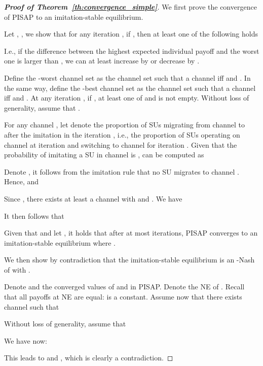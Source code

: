 \documentclass[12pt, onecolumn]{IEEEtran}
\theoremstyle{plain}
\theoremstyle{definition}
\begin{document}



\appendix

\begin{proof}[\textbf{Proof of Theorem~\ref{th:convergence_simple}}]

We first prove the convergence of PISAP to an imitation-stable equilibrium.

Let , , we show that for any iteration , if , then at least one of the following holds

I.e., if the difference between the highest expected individual payoff  and the worst one  is larger than , we can at least increase  by  or decrease  by .



Define the -worst channel set  as the channel set such that a channel  iff  and . In the same way, define the -best channel set  as the channel set such that a channel  iff  and . At any iteration , if , at least one of  and  is not empty. Without loss of generality, assume that .


For any channel , let  denote the proportion of SUs migrating from channel  to  after the imitation in the iteration , i.e., the proportion of SUs operating on channel  at iteration  and switching to channel  for iteration . Given that the probability of imitating a SU in channel  is ,  can be computed as


Denote , it follows from the imitation rule that no SU migrates to channel . Hence,  and


Since , there exists at least a channel  with  and . We have


It then follows that


Given that  and let , it holds that after at most  iterations, PISAP converges to an imitation-stable equilibrium where .

We then show by contradiction that the imitation-stable equilibrium is an -Nash of  with .

Denote  and  the converged values of  and  in PISAP. Denote  the NE of . Recall that all payoffs at NE are equal:  is a constant. Assume now that there exists channel  such that

Without loss of generality, assume that

We have now:


This leads to  and , which is clearly a contradiction.
\end{proof}
\end{document}
